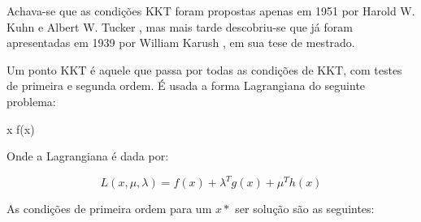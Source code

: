 Achava-se que as condições KKT foram propostas apenas em 1951 por Harold W. Kuhn e Albert W.
Tucker \cite{kuhn1951nonlinear}, mas mais tarde descobriu-se que já foram apresentadas em
1939 por William Karush \cite{karush1939minima}, em sua tese de mestrado.

Um ponto KKT é aquele que passa por todas as condições de KKT, com testes de primeira e segunda
ordem. É usada a forma Lagrangiana do seguinte problema:


\vspace{-15pt}
\begin{mini!}
{x}{ f(x) \label{kkt_obj}}{\label{prob_kkt}}{}
\end{mini!}

Onde a Lagrangiana é dada por:

\begin{equation}
  L(x, \mu, \lambda) = f(x) + \lambda^T g(x) + \mu^T h(x)
\end{equation}

As condições de primeira ordem para um \(x*\) ser solução são as seguintes:


